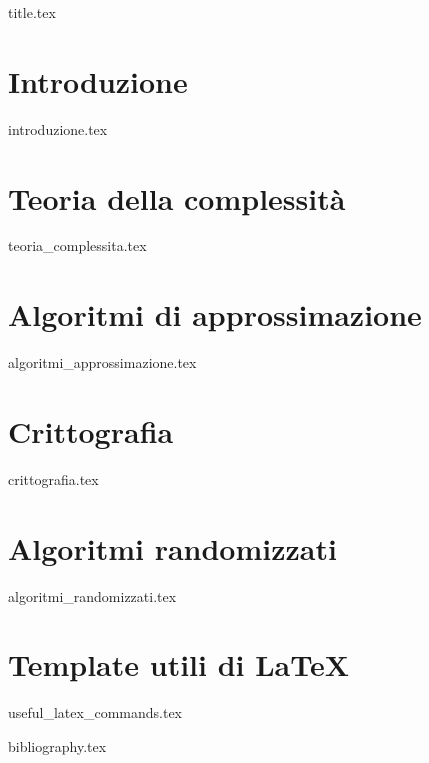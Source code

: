 \documentclass[a4paper,11pt,oneside]{book}
\begin{document}

\pagestyle{plain}

\frontmatter

{title.tex}

\tableofcontents

\mainmatter

\pagestyle{fancy}

\chapter*{Introduzione}
{introduzione.tex}

\chapter{Teoria della complessità}
{teoria_complessita.tex}

\chapter{Algoritmi di approssimazione}
{algoritmi_approssimazione.tex}

\chapter{Crittografia}
{crittografia.tex}

\chapter{Algoritmi randomizzati}
{algoritmi_randomizzati.tex}

\chapter{Template utili di \LaTeX}
{useful_latex_commands.tex}

\cleardoublepage

{bibliography.tex}
\end{document}
